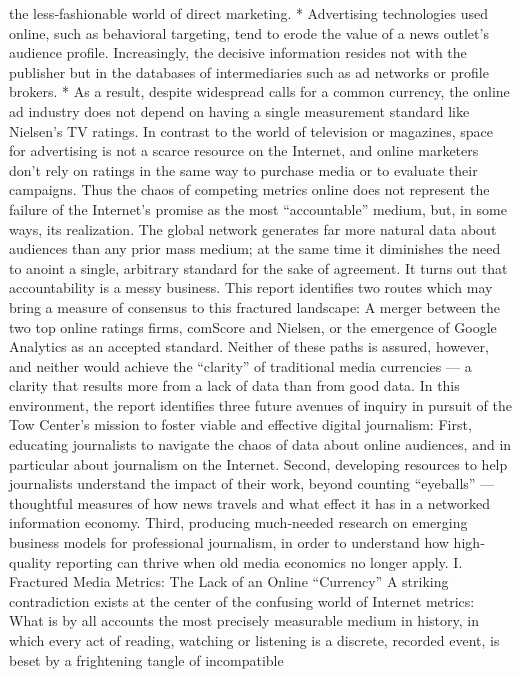 the less‐fashionable world of direct marketing.
* Advertising technologies used online, such as behavioral targeting, tend
to erode the value of a news outlet’s audience profile. Increasingly, the
decisive information resides not with the publisher but in the databases of
intermediaries such as ad networks or profile brokers.
* As a result, despite widespread calls for a common currency, the online
ad industry does not depend on having a single measurement standard
like Nielsen’s TV ratings. In contrast to the world of television or
magazines, space for advertising is not a scarce resource on the Internet,
and online marketers don’t rely on ratings in the same way to purchase
media or to evaluate their campaigns.
Thus the chaos of competing metrics online does not represent the failure
of the Internet’s promise as the most ``accountable'' medium, but, in some
ways, its realization. The global network generates far more natural data
about audiences than any prior mass medium; at the same time it
diminishes the need to anoint a single, arbitrary standard for the sake of
agreement. It turns out that accountability is a messy business.
This report identifies two routes which may bring a measure of consensus
to this fractured landscape: A merger between the two top online ratings
firms, comScore and Nielsen, or the emergence of Google Analytics as an
accepted standard. Neither of these paths is assured, however, and neither
would achieve the ``clarity'' of traditional media currencies — a clarity
that results more from a lack of data than from good data.
In this environment, the report identifies three future avenues of inquiry
in pursuit of the Tow Center’s mission to foster viable and effective digital
journalism:
First, educating journalists to navigate the chaos of data about online audiences,
and in particular about journalism on the Internet.
Second, developing resources to help journalists understand the impact of their
work, beyond counting ``eyeballs'' — thoughtful measures of how news travels
and what effect it has in a networked information economy.
Third, producing much‐needed research on emerging business models for
professional journalism, in order to understand how high‐quality reporting can
thrive when old media economics no longer apply.
I. Fractured Media Metrics: The Lack of an Online ``Currency''
A striking contradiction exists at the center of the confusing world of
Internet metrics: What is by all accounts the most precisely measurable
medium in history, in which every act of reading, watching or listening is
a discrete, recorded event, is beset by a frightening tangle of incompatible
